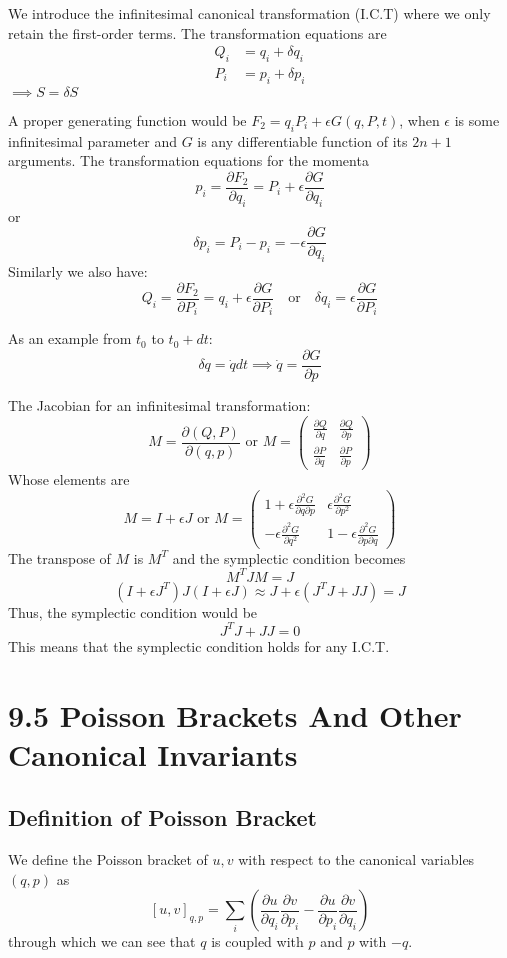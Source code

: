 \documentclass[12pt]{article}
\begin{document}
	We introduce the infinitesimal canonical transformation (I.C.T) where we only retain the first-order terms.
	The transformation equations are
	\begin{align*}
		Q_i &= q_i + \delta q_i \\
		P_i &= p_i + \delta p_i
	\end{align*}
	$\implies S = \delta S$
	
	A proper generating function would be $F_2 = q_i P_i + \epsilon G(q, P, t)$, when $\epsilon$ is some infinitesimal parameter and $G$ is any differentiable function of its $2n+1$ arguments.
	The transformation equations for the momenta
	\[ p_i = \frac{\partial F_2}{\partial q_i} = P_i + \epsilon \frac{\partial G}{\partial q_i} \]
	or
	\[ \delta p_i = P_i - p_i = -\epsilon \frac{\partial G}{\partial q_i} \]
	Similarly we also have:
	\[ Q_i = \frac{\partial F_2}{\partial P_i} = q_i + \epsilon \frac{\partial G}{\partial P_i} \quad \text{or} \quad \delta q_i = \epsilon \frac{\partial G}{\partial P_i} \]
	
	As an example from $t_0$ to $t_0+dt$:
	\[ \delta q = \dot{q} dt \implies \dot{q} = \frac{\partial G}{\partial p} \]
	
	The Jacobian for an infinitesimal transformation:
	\[ M = \frac{\partial(Q, P)}{\partial(q, p)} \text{ or } M = \begin{pmatrix} \frac{\partial Q}{\partial q} & \frac{\partial Q}{\partial p} \\ \frac{\partial P}{\partial q} & \frac{\partial P}{\partial p} \end{pmatrix} \]
	Whose elements are
	\[ M = I + \epsilon J \text{ or } M = \begin{pmatrix} 1 + \epsilon \frac{\partial^2 G}{\partial q \partial p} & \epsilon \frac{\partial^2 G}{\partial p^2} \\ -\epsilon \frac{\partial^2 G}{\partial q^2} & 1 - \epsilon \frac{\partial^2 G}{\partial p \partial q} \end{pmatrix} \]
	The transpose of $M$ is $M^T$ and the symplectic condition becomes
	\[ M^T J M = J \]
	\[ (I + \epsilon J^T) J (I + \epsilon J) \approx J + \epsilon (J^T J + J J) = J \]
	Thus, the symplectic condition would be
	\[ J^T J + J J = 0 \]
	This means that the symplectic condition holds for any I.C.T.
	\section*{9.5 Poisson Brackets And Other Canonical Invariants}
	
	\subsection*{Definition of Poisson Bracket}
	We define the Poisson bracket of $u, v$ with respect to the canonical variables $(q,p)$ as
	\[ [u,v]_{q,p} = \sum_i \left( \frac{\partial u}{\partial q_i} \frac{\partial v}{\partial p_i} - \frac{\partial u}{\partial p_i} \frac{\partial v}{\partial q_i} \right) \]
	through which we can see that $q$ is coupled with $p$ and $p$ with $-q$.
	
\end{document}
